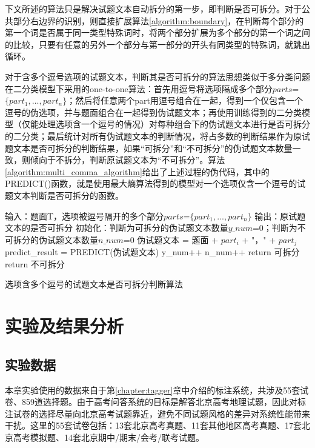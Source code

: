 \documentclass[master, winfont]{njuthesis}
\begin{document}
下文所述的算法只是解决试题文本自动拆分的第一步，即判断是否可拆分。对于公共部分右边界的识别，则直接扩展算法\ref{algorithm:boundary}，在判断每个部分的第一个词是否属于同一类型特殊词时，将两个部分扩展为多个部分的第一个词之间的比较，只要有任意的另外一个部分与第一部分的开头有同类型的特殊词，就跳出循环。

对于含多个逗号选项的试题文本，判断其是否可拆分的算法思想类似于多分类问题在二分类模型下采用的one-to-one算法：首先用逗号将选项隔成多个部分$parts$=$\{part_1, ..., part_n\}$；然后将任意两个part用逗号组合在一起，得到一个仅包含一个逗号的伪选项，并与题面组合在一起得到伪试题文本；再使用训练得到的二分类模型（仅能处理选项含一个逗号的情况）对每种组合下的伪试题文本进行是否可拆分的二分类；最后统计对所有伪试题文本的判断情况，将占多数的判断结果作为原试题文本是否可拆分的判断结果，如果“可拆分”和“不可拆分”的伪试题文本数量一致，则倾向于不拆分，判断原试题文本为“不可拆分”。算法\ref{algorithm:multi_comma_algorithm}给出了上述过程的伪代码，其中的PREDICT()函数，就是使用最大熵算法得到的模型对一个选项仅含一个逗号的试题文本判断是否可拆分的函数。

\begin{algorithm}
\begin{algorithmic}[1]
\STATE 输入：题面T，选项被逗号隔开的多个部分$parts$=$\{part_1, ..., part_n\}$
\STATE 输出：原试题文本的是否可拆分
\STATE 初始化：判断为可拆分的伪试题文本数量$y\_num$=0；判断为不可拆分的伪试题文本数量$n\_num$=0
		\STATE 伪试题文本 = 题面 + $part_i$ + "，" + $part_j$
		\STATE predict\_result = PREDICT(伪试题文本)
			\STATE y\_num++
		\ELSE
			\STATE n\_num++
		\ENDIF
	\ENDFOR
\ENDFOR
{}
	\STATE return 可拆分
\ELSE
	\STATE return 不可拆分
\ENDIF
\end{algorithmic}
\caption{\label{algorithm:multi_comma_algorithm}选项含多个逗号的试题文本是否可拆分判断算法}
\end{algorithm}

\section{实验及结果分析}
\subsection{实验数据}
本章实验使用的数据来自于第\ref{chapter:tagger}章中介绍的标注系统，共涉及55套试卷、859道选择题。由于高考问答系统的目标是解答北京高考地理试题，因此对标注试卷的选择尽量向北京高考试题靠近，避免不同试题风格的差异对系统性能带来干扰。这里的55套试卷包括：13套北京高考真题、11套其他地区高考真题、17套北京高考模拟题、14套北京期中/期末/会考/联考试题。
\end{document}

